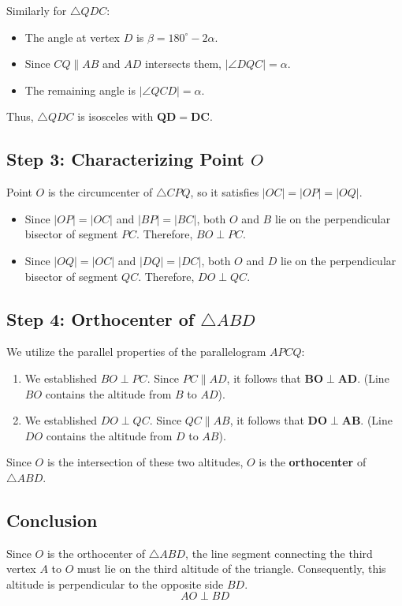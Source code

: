 \documentclass{MO}
\begin{document}
Similarly for $\triangle QDC$:
\begin{itemize}
    \item The angle at vertex $D$ is $\beta = 180^\circ - 2\alpha$.
    \item Since $CQ \parallel AB$ and $AD$ intersects them, $|\angle DQC| = \alpha$.
    \item The remaining angle is $|\angle QCD| = \alpha$.
\end{itemize}
Thus, $\triangle QDC$ is isosceles with $\mathbf{QD = DC}$.

\subsection*{Step 3: Characterizing Point $O$}
Point $O$ is the circumcenter of $\triangle CPQ$, so it satisfies $|OC| = |OP| = |OQ|$.
\begin{itemize}
    \item Since $|OP| = |OC|$ and $|BP| = |BC|$, both $O$ and $B$ lie on the perpendicular bisector of segment $PC$. Therefore, $BO \perp PC$.
    \item Since $|OQ| = |OC|$ and $|DQ| = |DC|$, both $O$ and $D$ lie on the perpendicular bisector of segment $QC$. Therefore, $DO \perp QC$.
\end{itemize}

\subsection*{Step 4: Orthocenter of $\triangle ABD$}
We utilize the parallel properties of the parallelogram $APCQ$:
\begin{enumerate}
    \item We established $BO \perp PC$. Since $PC \parallel AD$, it follows that $\mathbf{BO \perp AD}$. (Line $BO$ contains the altitude from $B$ to $AD$).
    \item We established $DO \perp QC$. Since $QC \parallel AB$, it follows that $\mathbf{DO \perp AB}$. (Line $DO$ contains the altitude from $D$ to $AB$).
\end{enumerate}
Since $O$ is the intersection of these two altitudes, $O$ is the \textbf{orthocenter} of $\triangle ABD$.

\subsection*{Conclusion}
Since $O$ is the orthocenter of $\triangle ABD$, the line segment connecting the third vertex $A$ to $O$ must lie on the third altitude of the triangle. Consequently, this altitude is perpendicular to the opposite side $BD$.
\[
    AO \perp BD
\]
\hfill \qedsymbol
\end{document}
